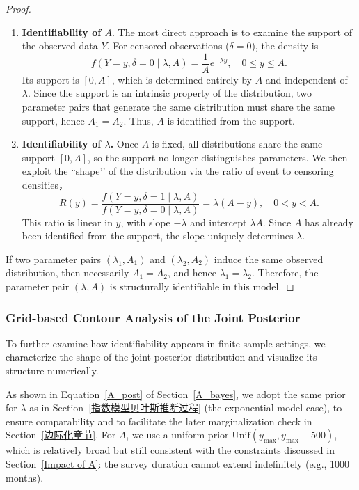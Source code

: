 \begin{proof}
    \begin{enumerate}
        \item \textbf{Identifiability of $A$}. The most direct approach is to examine the support of the observed data $Y$. For censored observations ($\delta=0$), the density is
         \begin{equation}
             f(Y=y,\delta=0 \mid \lambda,A) = \frac{1}{A} e^{-\lambda y}, \quad 0 \le y \le A.
         \end{equation}
         Its support is $[0, A]$, which is determined entirely by $A$ and independent of $\lambda$. Since the support is an intrinsic property of the distribution, two parameter pairs that generate the same distribution must share the same support, hence $A_1=A_2$. Thus, $A$ is identified from the support.
         \item \textbf{Identifiability of $\lambda$.}
         Once $A$ is fixed, all distributions share the same support $[0, A]$, so the support no longer distinguishes parameters. We then exploit the “shape’’ of the distribution via the ratio of event to censoring densities，
         \begin{equation}
             R(y) = \frac{f(Y=y,\delta=1 \mid \lambda,A)}{f(Y=y,\delta=0 \mid \lambda,A)} = \lambda (A-y), \quad 0<y<A.
         \end{equation}
         This ratio is linear in $y$, with slope $-\lambda$ and intercept $\lambda A$. Since $A$ has already been identified from the support, the slope uniquely determines $\lambda$.
    \end{enumerate}
    If two parameter pairs $(\lambda_1,A_1)$ and $(\lambda_2,A_2)$ induce the same observed distribution, then necessarily $A_1=A_2$, and hence $\lambda_1=\lambda_2$. Therefore, the parameter pair $(\lambda, A)$ is structurally identifiable in this model.
\end{proof}

\subsubsection{Grid-based Contour Analysis of the Joint Posterior}

To further examine how identifiability appears in finite-sample settings, we characterize the shape of the joint posterior distribution and visualize its structure numerically.

As shown in Equation~\eqref{A_post} of Section~\ref{A_bayes}, we adopt the same prior for $\lambda$ as in Section~\ref{指数模型贝叶斯推断过程} (the exponential model case), to ensure comparability and to facilitate the later marginalization check in Section~\ref{边际化章节}. For $A$, we use a uniform prior $\mathrm{Unif}(y_{\max}, y_{\max}+500)$, which is relatively broad but still consistent with the constraints discussed in Section~\ref{Impact of A}: the survey duration cannot extend indefinitely (e.g., 1000 months).


